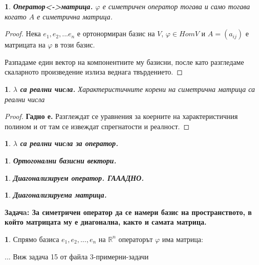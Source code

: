 \documentclass[11pt]{article}
\numberwithin{equation}{section}
\numberwithin{figure}{section}
\numberwithin{table}{section}
\theoremstyle{plain}
\theoremstyle{definition}
\theoremstyle{remark}
\theoremstyle{definition}
\theoremstyle{remark}
\theoremstyle{plain}
\theoremstyle{definition}
\theoremstyle{definition}
\newtheorem{example}[thm]{\protect\examplename}
\theoremstyle{plain}
\theoremstyle{plain}
\newtheorem{prop}[thm]{\protect\propositionname}
\theoremstyle{plain}
\theoremstyle{definition}
\theoremstyle{plain}
\providecommand{\examplename}{Пример}
\providecommand{\propositionname}{Твърдение}
\begin{document}
\begin{prop}
\textbf{Оператор<->матрица.}
$\varphi$ е симетричен оператор тогава и само тогава когато $A$ е симетрична матрица.
\end{prop}
\begin{proof}
Нека $e_1, e_2, ... e_n$ е ортонормиран базис на $V$, $\varphi \in HomV$ и $A = (a_{ij})$ е матрицата на $\varphi$ в този базис.

Разпадаме един вектор на компонентните му базисни, после като разгледаме скаларното произведение излиза веднага твърдението.
\end{proof}

\begin{prop}
\textbf{$\lambda$ са реални числа.}
Характеристичните корени на симетрична матрица са реални числа
\end{prop}
\begin{proof}
\textbf{Гадно е.}
Разглеждат се уравнения за коерните на характеристичния полином и от там се извеждат спрегнатости и реалност.
\end{proof}

\begin{prop}
\textbf{$\lambda$ са реални числа за оператор.}
\end{prop}

\begin{prop}
\textbf{Ортогонални базисни вектори.}
\end{prop}

\begin{prop}
\textbf{Диагонализируем оператор. ГАААДНО.}
\end{prop}

\begin{prop}
\textbf{Диагонализируема матрица.}
\end{prop}

\hrulefill

\textbf{Задачa: За симетричен оператор да се намери базис на пространството, в който матрицата му е диагонална, както и самата матрица.}

\begin{example}
Спрямо базиса $e_1, e_2, ..., e_n$ на $\mathbb{R}^n$ операторът $\varphi$ има матрица:

... Виж задача 15 от файла 3-примерни-задачи

\end{example}

\hrulefill
\end{document}
